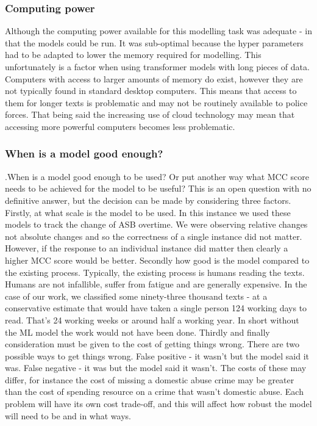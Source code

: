 \subsubsection{Computing power}Although the computing power available for this modelling task was adequate - in that the models could be run. It was  sub-optimal because the hyper parameters had to be adapted to lower the memory required for modelling. This unfortunately is a factor when using transformer models with long pieces of data. Computers with access to larger amounts of memory do exist, however they are not typically found in standard desktop computers. This means that access to them for longer texts is problematic and may not be routinely available to police forces. That being said the increasing use of cloud technology may mean that accessing more powerful computers becomes less problematic.

 
 \subsubsection{When is a model good enough?}  .When is a model good enough to be used? Or put another way what MCC score needs to be achieved for the model to be useful? This is an open question with no definitive answer, but the decision can be made by considering three factors. Firstly, at what scale is the model to be used. In this instance we used these models to track the change of ASB overtime. We were observing relative changes not absolute changes and so the correctness of a single instance did not matter. However, if the response to an individual instance did matter then clearly a higher MCC score would be better. Secondly how good is the model compared to the existing process. Typically, the existing process is humans reading the texts. Humans are not infallible, suffer from fatigue and are generally expensive. In the case of our work, we classified some ninety-three thousand texts - at a conservative estimate that would have taken a single person 124 working days to read. That's 24 working weeks or around half a working year. In short without the ML model the work would not have been done. Thirdly and finally consideration must be given to the cost of getting things wrong. There are two possible ways to get things wrong. False positive - it wasn't but the model said it was. False negative - it was but the model said it wasn't. The costs of these may differ, for instance the cost of missing a domestic abuse crime may be greater than the cost of spending resource on a crime that wasn't domestic abuse. Each problem will have its own cost trade-off, and this will affect how robust the model will need to be and in what ways.
 
